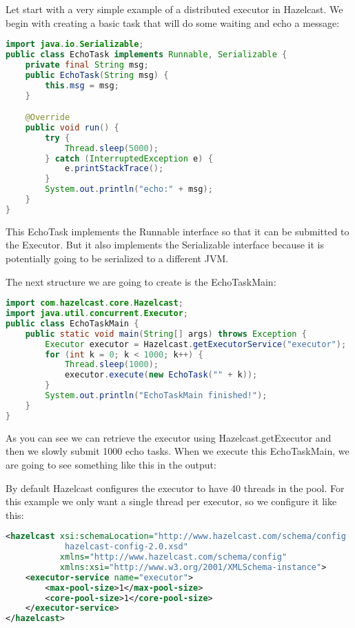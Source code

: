 Let start with a very simple example of a distributed executor in Hazelcast. We begin with creating a basic task that will do some waiting and echo a message:

\begin{lstlisting}[language=java]
import java.io.Serializable;
public class EchoTask implements Runnable, Serializable {
    private final String msg;
    public EchoTask(String msg) {
        this.msg = msg;
    }

    @Override
    public void run() {
        try {
            Thread.sleep(5000);
        } catch (InterruptedException e) {
            e.printStackTrace();
        }
        System.out.println("echo:" + msg);
    }
}
\end{lstlisting}

This EchoTask implements the Runnable interface so that it can be submitted to the Executor. But it also implements the Serializable interface because it is potentially going to be serialized to a different JVM. 

The next structure we are going to create is the EchoTaskMain:
\begin{lstlisting}[language=java]
import com.hazelcast.core.Hazelcast;
import java.util.concurrent.Executor;
public class EchoTaskMain {
    public static void main(String[] args) throws Exception {
        Executor executor = Hazelcast.getExecutorService("executor");
        for (int k = 0; k < 1000; k++) {
            Thread.sleep(1000);
            executor.execute(new EchoTask("" + k));
        }
        System.out.println("EchoTaskMain finished!");
    }
}
\end{lstlisting}
As you can see we can retrieve the executor using Hazelcast.getExecutor and then we slowly submit 1000 echo tasks. When we execute this EchoTaskMain, we are going to see something like this in the output:

By default Hazelcast configures the executor to have 40 threads in the pool. For this example we only want a single thread per executor, so we configure it like this:

\begin{lstlisting}[language=xml]
<hazelcast xsi:schemaLocation="http://www.hazelcast.com/schema/config
            hazelcast-config-2.0.xsd"
           xmlns="http://www.hazelcast.com/schema/config"
           xmlns:xsi="http://www.w3.org/2001/XMLSchema-instance">
    <executor-service name="executor">
        <max-pool-size>1</max-pool-size>
        <core-pool-size>1</core-pool-size>
    </executor-service>
</hazelcast>
\end{lstlisting}

